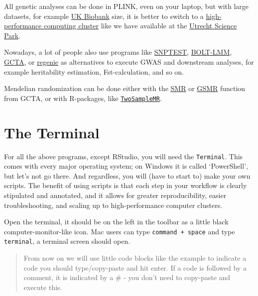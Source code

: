 \documentclass[
]{book}
\begin{document}
All genetic analyses can be done in PLINK, even on your laptop, but with large datasets, for example \href{https://www.ukbiobank.ac.uk}{UK Biobank} size, it is better to switch to a \href{https://en.wikipedia.org/wiki/High-performance_computing}{high-performance computing cluster} like we have available at the \href{https://wiki.bioinformatics.umcutrecht.nl/bin/view/HPC/WebHome}{Utrecht Science Park}.

Nowadays, a lot of people also use programs like \href{snptest}{SNPTEST}, \href{https://data.broadinstitute.org/alkesgroup/BOLT-LMM/}{BOLT-LMM}, \href{http://cnsgenomics.com/software/gcta/\#Overview}{GCTA}, or \href{https://rgcgithub.github.io/regenie/}{regenie} as alternatives to execute GWAS and downstream analyses, for example heritability estimation, Fst-calculation, and so on.

Mendelian randomization can be done either with the \href{http://cnsgenomics.com/software/smr/\#Overview}{SMR} or \href{http://cnsgenomics.com/software/gsmr/}{GSMR} function from GCTA, or with R-packages, like \href{https://mrcieu.github.io/TwoSampleMR/}{\texttt{TwoSampleMR}}.

\hypertarget{the-terminal}{%
\section{The Terminal}\label{the-terminal}}

For all the above programs, except RStudio, you will need the \texttt{Terminal}. This comes with every major operating system; on Windows it is called `PowerShell', but let's not go there. And regardless, you will (have to start to) make your own scripts. The benefit of using scripts is that each step in your workflow is clearly stipulated and annotated, and it allows for greater reproducibility, easier troubleshooting, and scaling up to high-performance computer clusters.

Open the terminal, it should be on the left in the toolbar as a little black computer-monitor-like icon.
Mac users can type \texttt{command\ +\ space} and type \texttt{terminal}, a terminal screen should open.

\begin{quote}
From now on we will use little code blocks like the example to indicate a code you should type/copy-paste and hit enter. If a code is followed by a comment, it is indicated by a \# - you don't need to copy-paste and execute this.
\end{quote}
\end{document}
